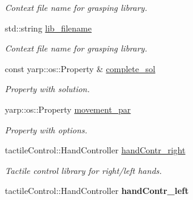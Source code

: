 \begin{DoxyCompactItemize}
\begin{DoxyCompactList}\small\item\em Context file name for grasping library. \end{DoxyCompactList}\item 
std\+::string \hyperlink{classGraspExecution_a87e0750990e15df008fcc51cd67d2538}{lib\+\_\+filename}\label{classGraspExecution_a87e0750990e15df008fcc51cd67d2538}

\begin{DoxyCompactList}\small\item\em Context file name for grasping library. \end{DoxyCompactList}\item 
const yarp\+::os\+::\+Property \& \hyperlink{classGraspExecution_a2f8d04ef2258f2dcc24ca3e68940e76d}{complete\+\_\+sol}\label{classGraspExecution_a2f8d04ef2258f2dcc24ca3e68940e76d}

\begin{DoxyCompactList}\small\item\em Property with solution. \end{DoxyCompactList}\item 
yarp\+::os\+::\+Property \hyperlink{classGraspExecution_a04447d31aa166b06a1cd4bb3f78f037d}{movement\+\_\+par}\label{classGraspExecution_a04447d31aa166b06a1cd4bb3f78f037d}

\begin{DoxyCompactList}\small\item\em Property with options. \end{DoxyCompactList}\item 
tactile\+Control\+::\+Hand\+Controller \hyperlink{classGraspExecution_a84c75bab538b1f14d23797262e75d20d}{hand\+Contr\+\_\+right}\label{classGraspExecution_a84c75bab538b1f14d23797262e75d20d}

\begin{DoxyCompactList}\small\item\em Tactile control library for right/left hands. \end{DoxyCompactList}\item 
tactile\+Control\+::\+Hand\+Controller {\bfseries hand\+Contr\+\_\+left}\label{classGraspExecution_a30e5c0cd3f888778671270d5a8ec7584}

\end{DoxyCompactItemize}
